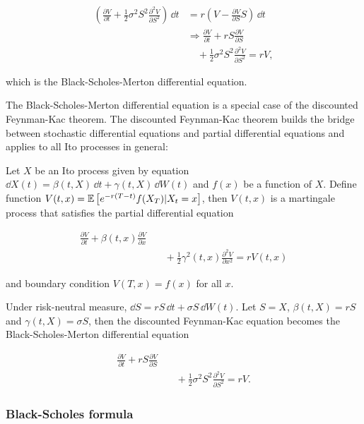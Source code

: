 \begin{solution}
\[
\begin{aligned}
\left(\frac{\partial V}{\partial t}+\frac{1}{2}\sigma^2S^2\frac{\partial^2V}{\partial S^2}\right)\,\dd t
&=r\left(V-\frac{\partial V}{\partial S}S\right)\,\dd t\\
&\Rightarrow \frac{\partial V}{\partial t}+rS\frac{\partial V}{\partial S}\\
&\quad+\frac{1}{2}\sigma^2S^2\frac{\partial^2V}{\partial S^2}=rV,
\end{aligned}
\]

which is the Black-Scholes-Merton differential equation.

The Black-Scholes-Merton differential equation is a special case of the discounted
Feynman-Kac theorem. The discounted Feynman-Kac theorem builds the bridge between
stochastic differential equations and partial differential equations and applies to all Ito
processes in general:

Let $X$ be an Ito process given by equation
$\dd X(t)=\beta(t,X)\,\dd t+\gamma(t,X)\,\dd W(t)$ and $f(x)$ be a function of $X$. Define function
$V(t,x)=\mathbb{E}\left[e^{-r(T-t)}f(X_T)\vert X_t=x\right]$, then $V(t,x)$ is a martingale process
that satisfies the partial differential equation

\[
\begin{aligned}
\frac{\partial V}{\partial t}+\beta(t,x)\frac{\partial V}{\partial x}\\
&\quad+\frac{1}{2}\gamma^2(t,x)\frac{\partial^2V}{\partial x^2}=rV(t,x)
\end{aligned}
\]

and boundary condition $V(T,x)=f(x)$ for all $x$.

Under risk-neutral measure, $\dd S=rS\,\dd t+\sigma S\,\dd W(t)$. Let $S=X$, $\beta(t,X)=rS$ and
$\gamma(t,X)=\sigma S$, then the discounted Feynman-Kac equation becomes the
Black-Scholes-Merton differential equation

\[
\begin{aligned}
\frac{\partial V}{\partial t}+rS\frac{\partial V}{\partial S}\\
&\quad+\frac{1}{2}\sigma^2S^2\frac{\partial^2V}{\partial S^2}=rV.
\end{aligned}
\]

\end{solution}

\subsubsection*{Black-Scholes formula}

